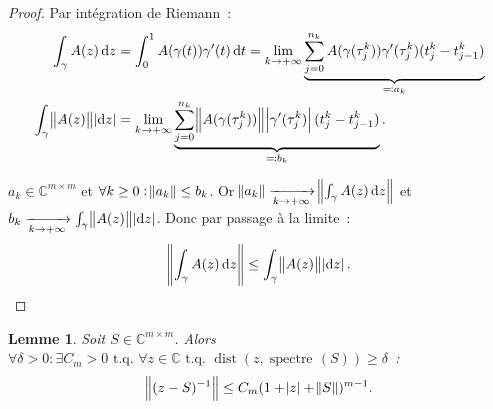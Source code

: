 \documentclass{report}
\DeclareMathOperator{\spectreOperator}{spectre\!}
\DeclareMathOperator{\dist}{dist}
\newcommand{\C}{{\mathbb C}}
\newcommand{\tq}{\text{ t.q. }}
\newcommand{\st}{\tq}
\newcommand{\pinfty}{{+\infty}}
\newcommand{\spectre}[1]{{\spectreOperator\left(#1\right)}}
\newtheorem{lem}[thm]{Lemme}
\theoremstyle{definition}
\theoremstyle{remark}
\begin{document}
\begin{proof} Par intégration de Riemann~:
\begin{align*}
	\int_\gamma A(z)\dif z &= \int_0^1 A(\gamma(t))\gamma'(t)\dif t
		= \lim_{k \to \pinfty}\underbrace {\sum_{j=0}^{n_k}A(\gamma(\tau_j^k))\gamma'(\tau_j^k)(t_j^k - t_{j-1}^k)}_{\eqqcolon a_k} \\
	\int_\gamma\norm {A(z)}\abs {\dif z} &= \lim_{k \to \pinfty}\underbrace {\sum_{j=0}^{n_k}\norm {A(\gamma(\tau_j^k))}\abs {\gamma'(\tau_j^k)}(t^k_j-t^k_{j-1})}_{\eqqcolon b_k}.
\end{align*}

$a_k \in \C^{m \times m}$ et $\forall k \geq 0 : \norm {a_k} \leq b_k$. Or $\norm {a_k} \xrightarrow[k \to \pinfty]{} \norm {\int_\gamma A(z)\dif z}$ et
$b_k \xrightarrow[k \to \pinfty]{} \int_\gamma \norm {A(z)}\abs {\dif z}$. Donc par passage à la limite~:
\[\norm {\int_\gamma A(z)\dif z} \leq \int_\gamma\norm {A(z)}\abs {\dif z}.\]
\end{proof}

\begin{lem}\label{lem:majoration inverse (z-S)} Soit $S \in \C^{m \times m}$. Alors $\forall \delta > 0 : \exists C_m > 0 \st \forall z \in \C \st \dist(z, \spectre S) \geq \delta$~:
\[\norm {(z-S)^{-1}} \leq C_m(1 + \abs z + \norm S)^{m-1}.\]
\end{lem}
\end{document}
